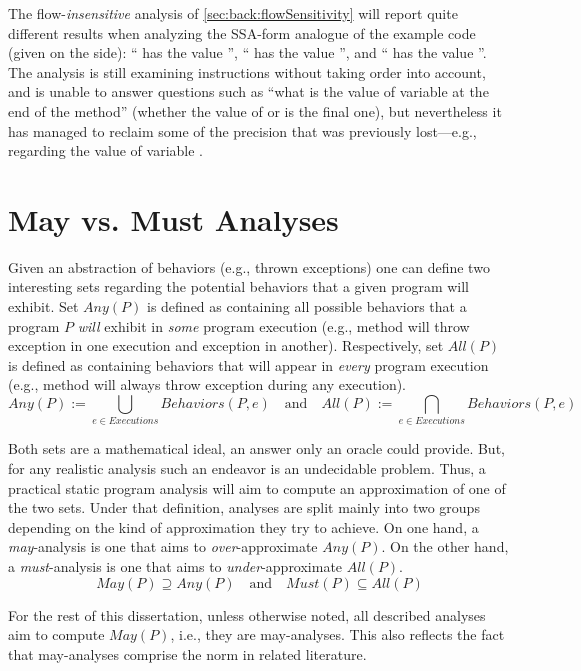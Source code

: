 The flow-\emph{insensitive} analysis of \ref{sec:back:flowSensitivity} will report quite different results when analyzing the SSA-form analogue of the example code (given on the side): `` has the value '', `` has the value '', and `` has the value ''. The analysis is still examining instructions without taking order into account, and is unable to answer questions such as ``what is the value of variable  at the end of the method'' (whether the value of  or  is the final one), but nevertheless it has managed to reclaim some of the precision that was previously lost---e.g., regarding the value of variable .



\section{May vs. Must Analyses}
\label{sec:back:may-must}

Given an abstraction of behaviors (e.g., thrown exceptions) one can define two interesting sets regarding the potential behaviors that a given program will exhibit. Set $Any(P)$ is defined as containing all possible behaviors that a program $P$ \emph{will} exhibit in \emph{some} program execution (e.g., method  will throw exception  in one execution and exception  in another). Respectively, set $All(P)$ is defined as containing behaviors that will appear in \emph{every} program execution (e.g., method  will always throw exception  during any execution).
\[
Any(P) := \bigcup_{e \in Executions} Behaviors(P, e)
\quad \textrm{and} \quad
All(P) := \bigcap_{e \in Executions} Behaviors(P, e)
\]

Both sets are a mathematical ideal, an answer only an oracle could provide. But, for any realistic analysis such an endeavor is an undecidable problem. Thus, a practical static program analysis will aim to compute an approximation of one of the two sets. Under that definition, analyses are split mainly into two groups depending on the kind of approximation they try to achieve. On one hand, a \emph{may}-analysis is one that aims to \emph{over}-approximate $Any(P)$. On the other hand, a \emph{must}-analysis is one that aims to \emph{under}-approximate $All(P)$.
\[
May(P) \supseteq Any(P) \quad \textrm{and} \quad Must(P) \subseteq All(P)
\]

For the rest of this dissertation, unless otherwise noted, all described analyses aim to compute $May(P)$, i.e., they are may-analyses. This also reflects the fact that may-analyses comprise the norm in related literature.


